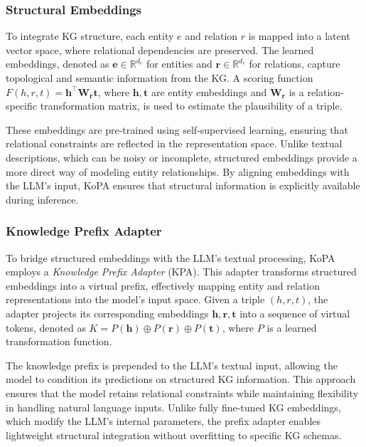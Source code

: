 \documentclass[12pt,a4paper]{article}
\begin{document}
\subsubsection{Structural Embeddings}
To integrate KG structure, each entity \( e \) and relation \( r \) is mapped into a latent vector space, where relational dependencies are preserved. The learned embeddings, denoted as \( \mathbf{e} \in \mathbb{R}^{d_e} \) for entities and \( \mathbf{r} \in \mathbb{R}^{d_r} \) for relations, capture topological and semantic information from the KG. A scoring function \( F(h, r, t) = \mathbf{h}^\top \mathbf{W_r} \mathbf{t} \), where \( \mathbf{h}, \mathbf{t} \) are entity embeddings and \( \mathbf{W_r} \) is a relation-specific transformation matrix, is used to estimate the plausibility of a triple.

These embeddings are pre-trained using self-supervised learning, ensuring that relational constraints are reflected in the representation space.
Unlike textual descriptions, which can be noisy or incomplete, structured embeddings provide a more direct way of modeling entity relationships.
By aligning embeddings with the LLM’s input, KoPA ensures that structural information is explicitly available during inference.

\subsubsection{Knowledge Prefix Adapter}

To bridge structured embeddings with the LLM’s textual processing, KoPA employs a \textit{Knowledge Prefix Adapter} (KPA). This adapter transforms structured embeddings into a virtual prefix, effectively mapping entity and relation representations into the model’s input space. Given a triple \( (h, r, t) \), the adapter projects its corresponding embeddings \( \mathbf{h}, \mathbf{r}, \mathbf{t} \) into a sequence of virtual tokens, denoted as \( K = P(\mathbf{h}) \oplus P(\mathbf{r}) \oplus P(\mathbf{t}) \), where \( P \) is a learned transformation function.

The knowledge prefix is prepended to the LLM’s textual input, allowing the model to condition its predictions on structured KG information.
This approach ensures that the model retains relational constraints while maintaining flexibility in handling natural language inputs.
Unlike fully fine-tuned KG embeddings, which modify the LLM’s internal parameters, the prefix adapter enables lightweight structural integration without overfitting to specific KG schemas.
\end{document}
